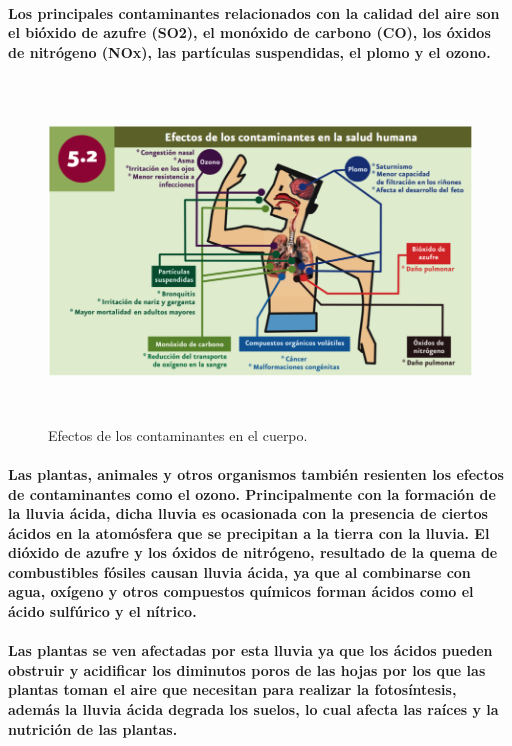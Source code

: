     \paragraph {Los principales contaminantes relacionados con la calidad del aire son el bióxido de azufre (SO2), el monóxido de carbono (CO), los óxidos  de nitrógeno (NOx), las partículas suspendidas, el plomo y el ozono.}
  
    \begin{figure}[h!]
      \centering
       \includegraphics[width=12.5cm,height=9cm]{./images/1.png}
       \caption{Efectos de los contaminantes en el cuerpo.}
    \end{figure}

    \paragraph {Las plantas, animales y otros organismos también resienten los efectos de contaminantes como el ozono. Principalmente con la formación de la lluvia ácida, dicha lluvia es ocasionada con la presencia de ciertos ácidos en la atomósfera que se precipitan a la tierra con la lluvia. El dióxido de azufre y los óxidos de nitrógeno, resultado de la quema de combustibles  fósiles causan lluvia ácida, ya que al combinarse con agua, oxígeno y otros compuestos químicos forman ácidos como el ácido sulfúrico y el nítrico. }
    \paragraph{Las plantas se ven afectadas por esta lluvia ya que los ácidos pueden obstruir y acidificar los diminutos poros de las hojas por los que las plantas toman el aire que necesitan para realizar la fotosíntesis, además la lluvia ácida degrada los suelos, lo cual afecta las raíces y la nutrición de las plantas.}
  
